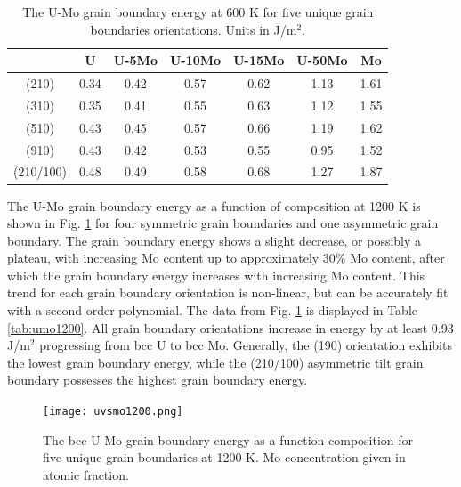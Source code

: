 \documentclass[review]{elsarticle}
\begin{document}
\FloatBarrier

\begin{table}[h]
\caption{The U-Mo grain boundary energy at 600 K for five unique grain boundaries orientations. Units in J/m$^{2}$. } \label{tab:umo600}
\begin{center}
\begin{tabular}{|c|c|c|c|c|c|c|}
	\hline
 & U & U-5Mo & U-10Mo & U-15Mo & U-50Mo & Mo \\
\hline
(210) & 0.34 & 0.42 & 0.57 & 0.62 & 1.13 & 1.61 \\
(310) & 0.35 & 0.41 & 0.55 & 0.63 & 1.12 & 1.55 \\ 
(510) & 0.43 & 0.45 & 0.57 & 0.66 & 1.19 & 1.62 \\ 
(910)	 & 0.43 & 0.42 & 0.53 & 0.55 & 0.95 & 1.52 \\ 
(210/100) & 0.48 & 0.49 & 0.58 & 0.68 & 1.27 & 1.87 \\
 	 \hline
\end{tabular}
\end{center}
\label{default}
\end{table}

\FloatBarrier

The U-Mo grain boundary energy as a function of composition at 1200 K is shown in Fig. \ref{fig:umo1200} for four symmetric grain boundaries and one asymmetric grain boundary. The grain boundary energy shows a slight decrease, or possibly a plateau, with increasing Mo content up to approximately 30\% Mo content, after which the grain boundary energy increases with increasing Mo content. This trend for each grain boundary orientation is non-linear, but can be accurately fit with a second order polynomial. The data from Fig. \ref{fig:umo1200} is displayed in Table \ref{tab:umo1200}. All grain boundary orientations increase in energy by at least 0.93 J/m$^{2}$ progressing from bcc U to bcc Mo. Generally, the (190) orientation exhibits the lowest grain boundary energy, while the (210/100) asymmetric tilt grain boundary possesses the highest grain boundary energy.

\begin{figure}[h]
 \centering
 \texttt{[image: uvsmo1200.png]} 
 \caption{The bcc U-Mo grain boundary energy as a function composition for five unique grain boundaries at 1200 K. Mo concentration given in atomic fraction.}
 \label{fig:umo1200}
\end{figure}
\end{document}
